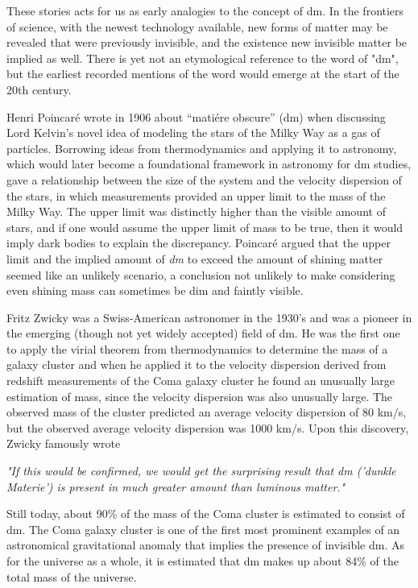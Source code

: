 These stories acts for us as early analogies to the concept of \gls{dm}. In the frontiers of science, with the newest technology available, new forms of matter may be revealed that were previously invisible, and the existence new invisible matter be implied as well. There is yet not an etymological reference to the word of "\gls{dm}", but the earliest recorded mentions of the word would emerge at the start of the 20th century. \cite{bertone2016-history-dark-matter}

Henri Poincaré wrote in 1906 about “matiére obscure” (\gls{dm}) when discussing Lord Kelvin’s novel idea of modeling the stars of the Milky Way as a gas of particles. Borrowing ideas from thermodynamics and applying it to astronomy, which would later become a foundational framework in astronomy for \gls{dm} studies, gave a relationship between the size of the system and the velocity dispersion of the stars, in which measurements provided an upper limit to the mass of the Milky Way. The upper limit was distinctly higher than the visible amount of stars, and if one would assume the upper limit of mass to be true, then it would imply dark bodies to explain the discrepancy. Poincaré argued that the upper limit and the implied amount of \textit{\gls{dm}} to exceed the amount of shining matter seemed like an unlikely scenario, a conclusion not unlikely to make considering even shining mass can sometimes be dim and faintly visible. \cite{bertone2016-history-dark-matter}

Fritz Zwicky was a Swiss-American astronomer in the 1930's and was a pioneer in the emerging (though not yet widely accepted) field of \gls{dm}. He was the first one to apply the virial theorem from thermodynamics to determine the mass of a galaxy cluster and when he applied it to the velocity dispersion derived from redshift measurements of the Coma galaxy cluster he found an unusually large estimation of mass, since the velocity dispersion was also unusually large. The observed mass of the cluster predicted an average velocity dispersion of 80 km/s, but the observed average velocity dispersion was 1000 km/s. Upon this discovery, Zwicky famously wrote 

\begin{center}
\textit{"If this would be confirmed, we would get the surprising result that \gls{dm} ('dunkle Materie') is present in much greater amount than luminous matter."}
\end{center}

Still today, about 90\% of the mass of the Coma cluster is estimated to consist of \gls{dm}. The Coma galaxy cluster is one of the first most prominent examples of an astronomical gravitational anomaly that implies the presence of invisible \gls{dm}. As for the universe as a whole, it is estimated that \gls{dm} makes up about 84\% of the total mass of the universe. 

